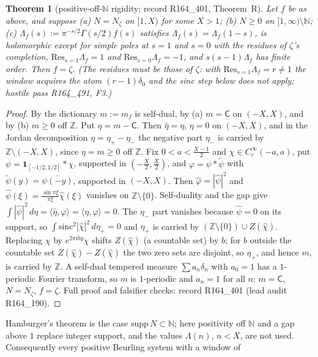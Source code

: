 \documentclass[11pt]{amsart}
\newtheorem{theorem}{Theorem}[section]
\theoremstyle{definition}
\theoremstyle{remark}
\newcommand{\N}{\mathbb N}
\begin{document}
\begin{theorem}[positive-off-$\N$ rigidity; record R164\_401, Theorem~R]\label{thm:R}
Let $f$ be as above, and suppose (a) $N=N_\zeta$ on $[1,X)$ for some $X>1$; (b) $N\ge0$ on $[1,\infty)\setminus\N$; (c)
$\Lambda_f(s):=\pi^{-s/2}\Gamma(s/2)f(s)$ satisfies $\Lambda_f(s)=\Lambda_f(1-s)$, is holomorphic except for simple poles at
$s=1$ and $s=0$ with the residues of $\zeta$'s completion, $\mathrm{Res}_{s=1}\Lambda_f=1$ and $\mathrm{Res}_{s=0}\Lambda_f=-1$, and
$s(s-1)\Lambda_f$ has finite order. Then $f=\zeta$. (The residues must be those of $\zeta$: with $\mathrm{Res}_{s=1}\Lambda_f=r\neq1$
the window acquires the atom $(r-1)\delta_0$ and the sinc step below does not apply; hostile pass R164\_491, F3.)
\end{theorem}
\begin{proof}
By the dictionary $m:=m_f$ is self-dual, by (a) $m=\mathsf C$ on $(-X,X)$, and by (b) $m\ge0$ off $\mathbb Z$. Put
$\eta=m-\mathsf C$. Then $\widehat\eta=\eta$, $\eta=0$ on $(-X,X)$, and in the Jordan decomposition $\eta=\eta_+-\eta_-$ the
negative part $\eta_-$ is carried by $\mathbb Z\setminus(-X,X)$, since $\eta=m\ge0$ off $\mathbb Z$. Fix $0<a<\frac{X-1}2$ and
$\chi\in C_c^\infty(-a,a)$, put $\psi=\mathbf 1_{[-1/2,1/2]}*\chi$, supported in $(-\frac X2,\frac X2)$, and
$\varphi=\psi*\tilde\psi$ with $\tilde\psi(y)=\overline{\psi(-y)}$, supported in $(-X,X)$. Then $\widehat\varphi=|\widehat\psi|^2$
and $\widehat\psi(\xi)=\frac{\sin\pi\xi}{\pi\xi}\widehat\chi(\xi)$ vanishes on $\mathbb Z\setminus\{0\}$. Self-duality and the
gap give
$\int|\widehat\psi|^2\,d\eta=\langle\widehat\eta,\varphi\rangle=\langle\eta,\varphi\rangle=0$.
The $\eta_-$ part vanishes because $\widehat\psi=0$ on its support, so $\int\mathrm{sinc}^2|\widehat\chi|^2\,d\eta_+=0$ and $\eta_+$
is carried by $(\mathbb Z\setminus\{0\})\cup Z(\widehat\chi)$. Replacing $\chi$ by $e^{2\pi iby}\chi$ shifts $Z(\widehat\chi)$
(a countable set) by $b$; for $b$ outside the countable set $Z(\widehat\chi)-Z(\widehat\chi)$ the two zero sets are disjoint, so
$\eta_+$, and hence $m$, is carried by $\mathbb Z$. A self-dual tempered measure $\sum a_n\delta_n$ with $a_0=1$ has a
$1$-periodic Fourier transform, so $m$ is $1$-periodic and $a_n=1$ for all $n$: $m=\mathsf C$, $N=N_\zeta$, $f=\zeta$.
Full proof and falsifier checks: record R164\_401 (lead audit R164\_190).
\end{proof}
\noindent Hamburger's theorem is the case $\mathrm{supp}\,N\subset\N$; here positivity off $\N$ and a gap above $1$ replace
integer support, and the values $\Lambda(n)$, $n<X$, are not used. Consequently every positive Beurling system with a window of
\end{document}
